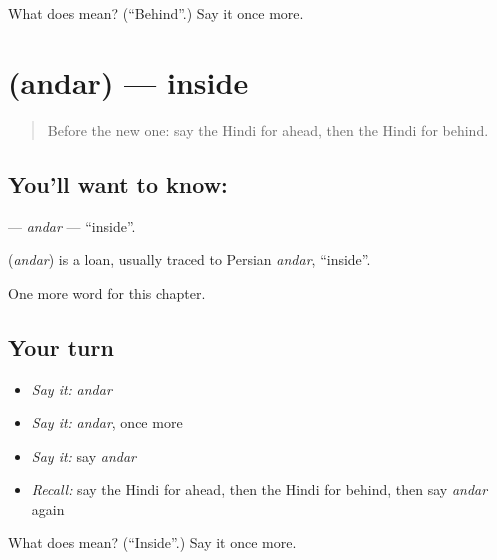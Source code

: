 \begin{tcolorbox}[breakable,colback=teal!4,colframe=teal!35!black,title={Before you move on}]
What does  mean? (\textquotedblleft{}Behind\textquotedblright{}.) Say it once more.
\end{tcolorbox}
\section[\texorpdfstring{\hi{अंदर} (andar)}{अंदर (andar)}]{ (andar) — inside}

\label{lesson:HI-C235-andar}



\begin{quote}
Before the new one: say the Hindi for ahead, then the Hindi for behind.
\end{quote}

\subsection*{You'll want to know: }
\textbf{} — \emph{andar} — \textquotedblleft{}inside\textquotedblright{}.

\begin{cousinweb}
\textbf{} (\emph{andar}) is a loan, usually traced to Persian \emph{andar}, \textquotedblleft{}inside\textquotedblright{}.
\end{cousinweb}

\begin{grammarlens}[title={What you've built}]
One more word for this chapter.
\end{grammarlens}

\subsection*{Your turn}
\begin{itemize}
\raggedright
  \item \emph{Say it:} \emph{andar}
  \item \emph{Say it:} \emph{andar}, once more
  \item \emph{Say it:} say \emph{andar}
  \item \emph{Recall:} say the Hindi for ahead, then the Hindi for behind, then say \emph{andar} again
\end{itemize}

\begin{tcolorbox}[breakable,colback=teal!4,colframe=teal!35!black,title={Before you move on}]
What does  mean? (\textquotedblleft{}Inside\textquotedblright{}.) Say it once more.
\end{tcolorbox}
